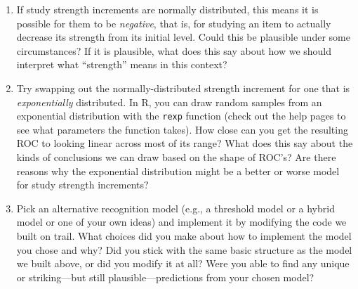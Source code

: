 \documentclass[
]{book}
\providecommand{\tightlist}{%
  \setlength{\itemsep}{0pt}\setlength{\parskip}{0pt}}
\begin{document}
\begin{enumerate}
\def\labelenumi{\arabic{enumi}.}
\tightlist
\item
  If study strength increments are normally distributed, this means it is possible for them to be \emph{negative}, that is, for studying an item to actually decrease its strength from its initial level. Could this be plausible under some circumstances? If it is plausible, what does this say about how we should interpret what ``strength'' means in this context?
\item
  Try swapping out the normally-distributed strength increment for one that is \emph{exponentially} distributed. In R, you can draw random samples from an exponential distribution with the \texttt{rexp} function (check out the help pages to see what parameters the function takes). How close can you get the resulting ROC to looking linear across most of its range? What does this say about the kinds of conclusions we can draw based on the shape of ROC's? Are there reasons why the exponential distribution might be a better or worse model for study strength increments?
\item
  Pick an alternative recognition model (e.g., a threshold model or a hybrid model or one of your own ideas) and implement it by modifying the code we built on trail. What choices did you make about how to implement the model you chose and why? Did you stick with the same basic structure as the model we built above, or did you modify it at all? Were you able to find any unique or striking---but still plausible---predictions from your chosen model?
\end{enumerate}

  
\end{document}
